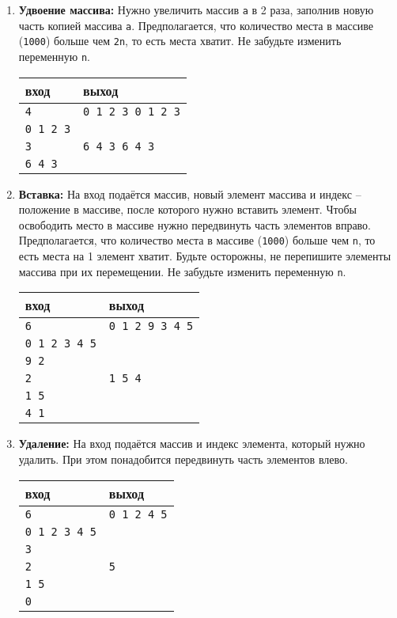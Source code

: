 \documentclass{article}
\begin{document}
\begin{enumerate}
\item \textbf{Удвоение массива:} Нужно увеличить массив \texttt{a} в 2 раза, заполнив новую часть копией массива \texttt{a}. Предполагается, что количество места в массиве (\texttt{1000}) больше чем \texttt{2n}, то есть места хватит. Не забудьте изменить переменную \texttt{n}.
\begin{center}
\begin{tabular}{ l | l }
 вход & выход \\ \hline
 \texttt{4} & \texttt{0 1 2 3 0 1 2 3}  \\  
 \texttt{0 1 2 3} &  \\ \hline
 \texttt{3} & \texttt{6 4 3 6 4 3}  \\
 \texttt{6 4 3} &  \\  
\end{tabular}
\end{center}

\item \textbf{Вставка:} На вход подаётся массив, новый элемент массива и индекс -- положение в массиве, после которого нужно вставить элемент. Чтобы освободить место в массиве нужно передвинуть часть элементов вправо. Предполагается, что количество места в массиве (\texttt{1000}) больше чем \texttt{n}, то есть места на 1 элемент хватит. Будьте осторожны, не перепишите элементы массива при их перемещении. Не забудьте изменить переменную \texttt{n}.
\begin{center}
\begin{tabular}{ l | l }
 вход & выход \\ \hline
 \texttt{6} & \texttt{0 1 2 9 3 4 5}  \\  
 \texttt{0 1 2 3 4 5} &  \\ 
 \texttt{9 2} &   \\ \hline
 \texttt{2} & \texttt{1 5 4}  \\  
 \texttt{1 5} &  \\ 
 \texttt{4 1} &   \\
\end{tabular}
\end{center}

\item \textbf{Удаление:} На вход подаётся массив и индекс элемента, который нужно удалить. При этом понадобится передвинуть часть элементов влево.
\begin{center}
\begin{tabular}{ l | l }
 вход & выход \\ \hline
 \texttt{6} & \texttt{0 1 2 4 5}  \\  
 \texttt{0 1 2 3 4 5} &  \\ 
 \texttt{3} &   \\ \hline
 \texttt{2} & \texttt{5}  \\  
 \texttt{1 5} &  \\ 
 \texttt{0} &   \\
\end{tabular}
\end{center}


\end{enumerate}
\end{document}
